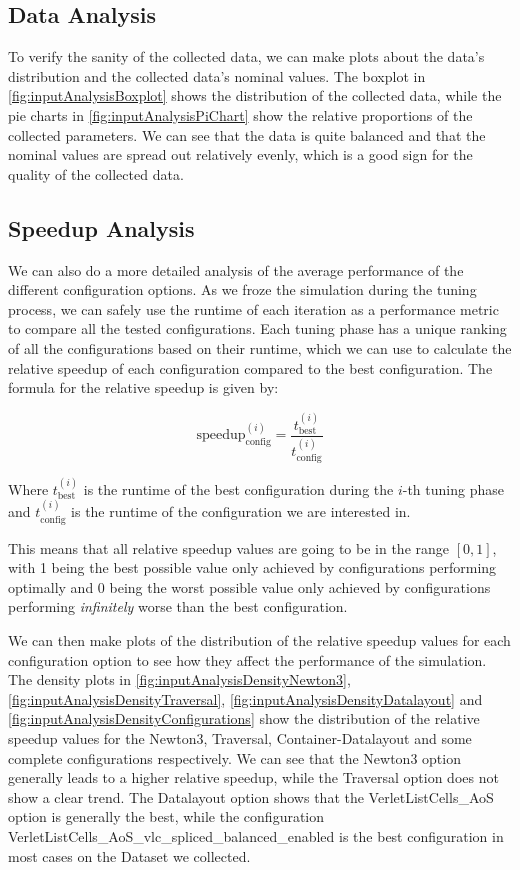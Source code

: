 \subsection{Data Analysis}


To verify the sanity of the collected data, we can make plots about the data's distribution and the collected data's nominal values. The boxplot in \autoref{fig:inputAnalysisBoxplot} shows the distribution of the collected data, while the pie charts in \autoref{fig:inputAnalysisPiChart} show the relative proportions of the collected parameters. We can see that the data is quite balanced and that the nominal values are spread out relatively evenly, which is a good sign for the quality of the collected data.



\subsection{Speedup Analysis}

We can also do a more detailed analysis of the average performance of the different configuration options. As we froze the simulation during the tuning process, we can safely use the runtime of each iteration as a performance metric to compare all the tested configurations. Each tuning phase has a unique ranking of all the configurations based on their runtime, which we can use to calculate the relative speedup of each configuration compared to the best configuration. The formula for the relative speedup is given by:

\begin{equation}
    {\text{speedup}^{(i)}_{\text{config}}}= \frac{t_{\text{best}}^{(i)}}{t_{\text{config}}^{(i)}}
\end{equation}

Where $t_{\text{best}}^{(i)}$ is the runtime of the best configuration during the $i$-th tuning phase and $t_{\text{config}}^{(i)}$ is the runtime of the configuration we are interested in.

This means that all relative speedup values are going to be in the range $[0,1]$, with 1 being the best possible value only achieved by configurations performing optimally and 0 being the worst possible value only achieved by configurations performing \emph{infinitely} worse than the best configuration.

We can then make plots of the distribution of the relative speedup values for each configuration option to see how they affect the performance of the simulation. The density plots in \autoref{fig:inputAnalysisDensityNewton3}, \autoref{fig:inputAnalysisDensityTraversal}, \autoref{fig:inputAnalysisDensityDatalayout} and \autoref{fig:inputAnalysisDensityConfigurations} show the distribution of the relative speedup values for the Newton3, Traversal, Container-Datalayout and some complete configurations respectively. We can see that the Newton3 option generally leads to a higher relative speedup, while the Traversal option does not show a clear trend. The Datalayout option shows that the VerletListCells\_AoS option is generally the best, while the configuration VerletListCells\_AoS\_vlc\_spliced\_balanced\_enabled is the best configuration in most cases on the Dataset we collected.

